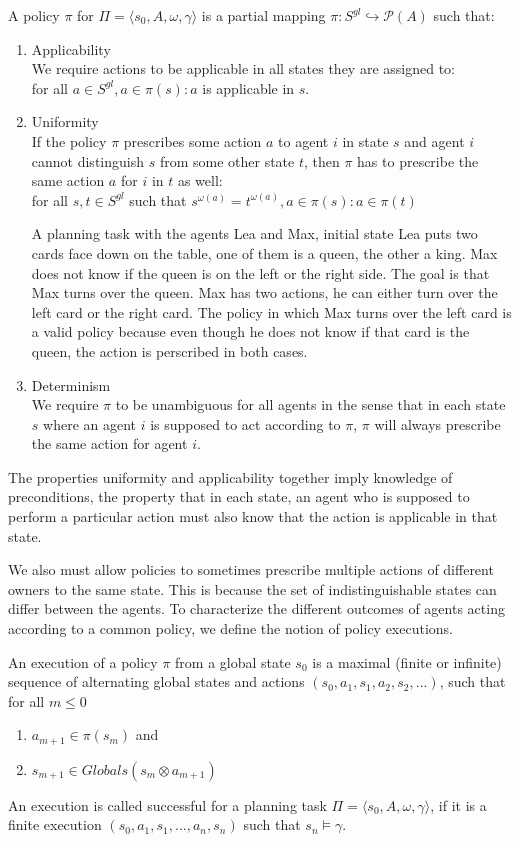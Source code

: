 A policy $\pi$ for $\Pi = \langle s_0, A, \omega, \gamma \rangle$ is a partial mapping $\pi: S^{gl} \hookrightarrow \mathcal{P}(A)$ such that:
\begin{enumerate}
  \item Applicability\\
    We require actions to be applicable in all states they are assigned to: \\
    for all $a \in S^{gl}, a \in \pi(s): a$ is applicable in $s$.
  \item Uniformity \\
    If the policy $\pi$ prescribes some action $a$ to agent $i$ in state $s$ and agent $i$ cannot distinguish $s$ from some other state $t$, then $\pi$ has to prescribe the same action $a$ for $i$ in $t$ as well: \\
    for all $s,t \in S^{gl} $ such that $ s^{\omega(a)} = t^{\omega(a)}, a \in \pi(s): a \in \pi(t)$

    A planning task with the agents Lea and Max,
    initial state Lea puts two cards face down on the table, one of them is a queen, the other a king. Max does not know if the queen is on the left or the right side. The goal is that Max turns over the queen. Max has two actions, he can either turn over the left card or the right card. The policy in which Max turns over the left card is a valid policy because even though he does not know if that card is the queen, the action is perscribed in both cases.


  \item Determinism \\
    We require $\pi$ to be unambiguous for all agents in the sense that in each state $s$ where an agent $i$ is supposed to act according to $\pi$, $\pi$ will always prescribe the same action for agent $i$.
\end{enumerate}

The properties uniformity and applicability together imply knowledge of preconditions, the property that in each state, an agent who is supposed to perform a particular action must also know that the action is applicable in that state.

We also must allow policies to sometimes prescribe multiple actions of different owners to the same state. This is because the set of indistinguishable states can differ between the agents. To characterize the different outcomes of agents acting according to a common policy, we define the notion of policy executions.

An execution of a policy $\pi$ from a global state $s_0$ is a maximal (finite or infinite) sequence of alternating global states and actions $(s_0, a_1, s_1, a_2, s_2,...)$, such that for all $ m \leq 0$
\begin{enumerate}
  \item $a_{m+1} \in \pi(s_m)$ and
  \item $s_{m+1} \in Globals(s_m \otimes a_{m+1})$
\end{enumerate}
An execution is called successful for a planning task $\Pi = \langle s_0, A, \omega, \gamma \rangle$, if it is a finite execution $(s_0, a_1, s_1,...,a_n, s_n)$ such that $s_n \models \gamma$.

